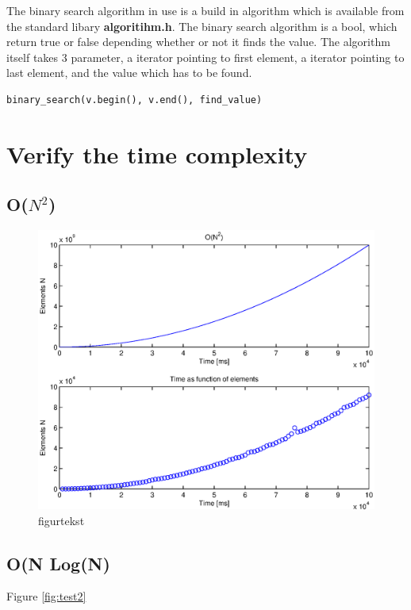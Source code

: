 The binary search algorithm in use is a build in algorithm which is available from the standard libary \textbf{algoritihm.h}. The binary search algorithm is a bool, which return true or false depending whether or not it finds the value.  The algorithm itself takes 3 parameter, 	a iterator pointing to first element, a iterator pointing to last element, and the value which has to be found. 
\begin{lstlisting}
binary_search(v.begin(), v.end(), find_value)
\end{lstlisting}
\newpage
\section{Verify the time complexity}




\subsection{O(\(N^{2}\))}



\begin{figure}[th!]
\centering
\includegraphics[width=1\textwidth]{./graphics/test1.eps}
\caption[tekst i indholdsfortegnelsen]{figurtekst}
\label{fig:}
\end{figure}
\newpage


\subsection{O(N Log(N)}
Figure \ref{fig:test2}


